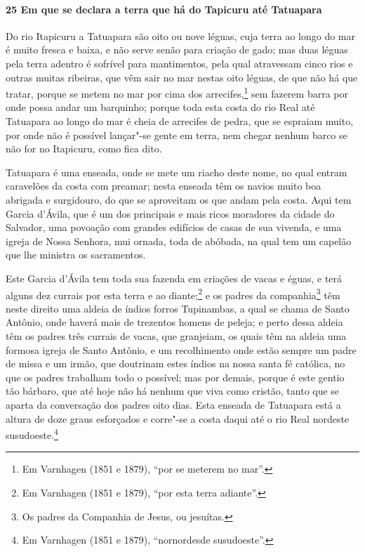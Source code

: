 \begin{linenumbers}
\paragraph{25 Em que se declara a terra que há do Tapicuru até Tatuapara} \quad
Do rio Itapicuru a Tatuapara são oito ou nove léguas, cuja terra ao longo do mar é muito
fresca e baixa, e não serve senão para criação de gado; mas duas léguas pela terra adentro
é sofrível para mantimentos, pela qual atravessam cinco rios e outras muitas ribeiras, que
vêm sair no mar nestas oito léguas, de que não há que tratar, porque se metem no mar por
cima dos arrecifes,\footnote{ Em Varnhagen (1851 e 1879), ``por se meterem no mar''.} sem
fazerem barra por onde possa andar um barquinho; porque toda esta costa do rio Real até
Tatuapara ao longo do mar é cheia de arrecifes de pedra, que se espraiam muito, por onde
não é possível lançar"-se gente em terra, nem chegar nenhum barco se não for no Itapicuru,
como fica dito.

Tatuapara é uma enseada, onde se mete um riacho deste nome, no qual entram caravelões da
costa com preamar; nesta enseada têm os navios muito boa abrigada e surgidouro, do que se
aproveitam os que andam pela costa. Aqui tem Garcia d'Ávila, que é um dos principais e
mais ricos moradores da cidade do Salvador, uma povoação com grandes edifícios de casas de
sua vivenda, e uma igreja de Nossa Senhora, mui ornada, toda de abóbada, na qual tem um
capelão que lhe ministra os sacramentos.

Este Garcia d'Ávila tem toda sua fazenda em criações de vacas e éguas, e terá alguns dez
currais por esta terra e ao diante;\footnote{ Em Varnhagen (1851 e 1879), ``por esta terra
adiante''.} e os padres da companhia\footnote{ Os padres da Companhia de Jesus, ou
jesuítas.} têm neste direito uma aldeia de índios forros Tupinambas, a qual se chama de
Santo Antônio, onde haverá mais de trezentos homens de peleja; e perto dessa aldeia têm os
padres três currais de vacas, que granjeiam, os quais têm na aldeia uma formosa igreja de
Santo Antônio, e um recolhimento onde estão sempre um padre de missa e um irmão, que
doutrinam estes índios na nossa santa fé católica, no que os padres trabalham todo o
possível; mas por demais, porque é este gentio tão bárbaro, que até hoje não há nenhum que
viva como cristão, tanto que se aparta da conversação dos padres oito dias. Esta enseada
de Tatuapara está a altura de doze graus esforçados e corre"-se a costa daqui até o rio
Real nordeste susudoeste.\footnote{ Em Varnhagen (1851 e 1879), ``nornordesde
susudoeste''.}


\end{linenumbers}
